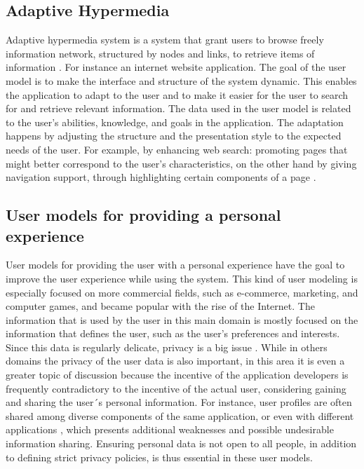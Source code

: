 \subsection{Adaptive Hypermedia}

Adaptive hypermedia system is a system that grant users to browse freely
information network, structured by nodes and links, to retrieve items of
information \cite{deepa2012adaptive}. For instance an internet website
application. The goal of the user model is to make the interface and structure
of the system dynamic. This enables the application to adapt to the user and to
make it easier for the user to search for and retrieve relevant information.
The data used in the user model is related to the user’s abilities, knowledge,
and goals in the application. The adaptation happens by adjusting the structure
and the presentation style to the expected needs of the user. For example, by
enhancing web search: promoting pages that might better correspond to the user’s
characteristics, on the other hand by giving navigation support, through
highlighting certain components of a page \cite{razmerita2012user}.

\subsection{User models for providing a personal experience}

User models for providing the user with a personal experience have the goal to
improve the user experience while using the system. This kind of user modeling
is especially focused on more commercial fields, such as e-commerce, marketing,
and computer games, and became popular with the rise of the Internet. The
information that is used by the user in this main domain is mostly focused on
the information that defines the user, such as the user’s preferences and
interests. Since this data is regularly delicate, privacy is a big issue
\cite{toch2012personalization}. While in others domains the privacy of the user
data is also important, in this area it is even a greater topic of discussion
because the incentive of the application developers is frequently contradictory
to the incentive of the actual user, considering gaining and sharing the user´s
personal information. For instance, user profiles are often shared among diverse
components of the same application, or even with different applications
\cite{brun2010compass} \cite{karam2012modeling}, which presents additional
weaknesses and possible undesirable information sharing. Ensuring personal data
is not open to all people, in addition to defining strict privacy policies, is
thus essential in these user models.

